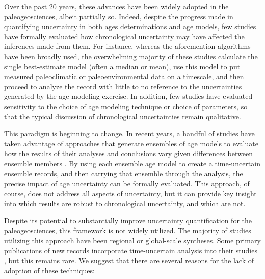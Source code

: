 \documentclass[gchron, manuscript]{copernicus}
\begin{document}
Over the past 20 years, these advances have been widely adopted in the paleogeosciences, albeit partially so.
Indeed, despite the progress made in quantifying uncertainty in both ages determinations and age models, few studies have formally evaluated how chronological uncertainty may have affected the inferences made from them.
For instance, whereas the aforemention algorithms have been broadly used, the overwhelming majority of these studies calculate the single best-estimate model (often a median or mean), use this model to put measured paleoclimatic or paleoenvironmental data on a timescale, and then proceed to analyze the record with little to no reference to the uncertainties generated by the age modeling exercise.
In addition, few studies have evaluated sensitivity to the choice of age modeling technique or choice of parameters, so that the typical discussion of chronological uncertainties remain qualitative.

This paradigm is beginning to change.
In recent years, a handful of studies have taken advantage of approaches that generate ensembles of age models to evaluate how the results of their analyses and conclusions vary given differences between ensemble members \citep[e.g.,][]{Haam_Huybers2010, Tierney2013, deininger2017coherency, mckay_onset_2018, bhattacharya2020atlantic}.
By using each ensemble age model to create a time-uncertain ensemble records, and then carrying that ensemble through the analysis, the precise impact of age uncertainty can be formally evaluated.
This approach, of course, does not address all aspects of uncertainty, but it can provide key insight into which results are robust to chronological uncertainty, and which are not.

Despite its potential to substantially improve uncertainty quantification for the paleogeosciences, this framework is not widely utilized.
The majority of studies utilizing this approach have been regional \citep[e.g.,][]{Tierney2013, deininger2017coherency, mckay_onset_2018, bhattacharya2020atlantic} or global-scale \citep[e.g.,][]{Shakun_Nature2012, Marcott_Science2013, kaufman2020HoloceneGMST} syntheses.
Some primary publications of new records incorporate time-uncertain analysis into their studies \citep[e.g.,][]{Boldt2015, falster2018millennial}, but this remains rare.
We suggest that there are several reasons for the lack of adoption of these techniques:
\end{document}
